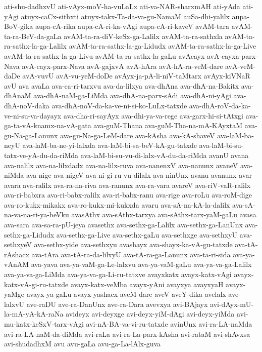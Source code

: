 {ati-shu-dadhxvU
ati-vAyx-moV-ha-vuLaLx
ati-va-NAR-sharxmAH
ati-yAda
ati-yAgi
atuyx-caCx-sithxti
atuyx-takx-Ta-da-va-gu-NamaM
auSa-dhi-yalilx
aupa-BoV-gika
aupa-cA-rika
aupa-cA-ri-ka-vAgi
aupa-cA-ri-kaveV
avAM-tara
avAM-ta-ra-BeV-da-gaLa
avAM-ta-ra-diV-keSx-ga-Lalilx
avAM-ta-ra-sathxla
avAM-ta-ra-sathx-la-ga-Lalilx
avAM-ta-ra-sathx-la-ga-Lidudx
avAM-ta-ra-sathx-la-ga-Live
avAM-ta-ra-sathx-la-ga-Livu
avAM-ta-ra-sathx-la-gaLu
avAcayx
avA-cayxa-parx-Nava
avA-cayx-parx-Nava
avA-gajxvA
avA-hAra
avA-hA-ra-veM-dare
avA-veM-daDe
avA-vuvU
avA-vu-yeM-doDe
avAyx-ja-pA-li-niV-taMtarx
avAyx-kiVNaR
avU
ava
avaLa
ava-ca-ri-tarxvu
ava-da-lilxya
ava-dhAna
ava-dhA-na-Bakitx
ava-dhAnaM
ava-dhA-naM-ga-LiMda
ava-dhA-na-parx-sAdi
ava-dhA-ni-yAgi
ava-dhA-noV-daka
ava-dhA-noV-da-ka-ve-ni-si-ko-LuLx-tatxde
ava-dhA-roV-da-ka-ve-ni-su-va-dayayx
ava-dha-ri-sayAyx
ava-dhi-ya-va-rege
ava-garx-hi-si-tAtxgi
ava-ga-ta-vA-knamx-na-vA-gata
ava-guM-Thana
ava-guM-Tha-na-mA-KAyxtaM
ava-gu-Na-ga-Lanunx
ava-gu-Na-ga-LeM-dare
ava-kAsha
ava-kA-shaveV
ava-laM-ba-neyU
ava-laM-ba-ne-yi-lalxda
ava-laM-bi-sa-beV-kA-gu-tatxde
ava-laM-bi-su-tatx-ve-yA-du-da-riMda
ava-laM-bi-su-vu-di-lalx-vA-du-da-riMda
avanU
avana
ava-nalilx
ava-na-lilxdadx
ava-na-lilx-ruva
ava-nanenxV
ava-nanunx
avaneV
ava-niMda
ava-nige
ava-nigeV
ava-ni-gi-ru-vu-dilalx
ava-ninUnx
avanu
avanunx
avar
avara
ava-ralilx
ava-ra-na-riva
ava-ranunx
ava-ra-vara
avareV
ava-riV-vaR-ralilx
ava-ri-babxra
ava-ri-babx-ralilx
ava-ri-babx-ranu
ava-rige
ava-roLu
ava-roM-dige
ava-ro-kukx-mikakx
ava-ro-kukx-mi-kukxda
avaru
ava-sA-na-kA-la-dalilx
ava-sA-na-va-na-ri-ya-beVku
avasAthx
ava-sAthx-tarxya
ava-sAthx-tarx-yaM-gaLu
avasa
ava-sara
ava-sa-ra-pU-jeya
avasethx
ava-sethx-ga-Lalilx
ava-sethx-ga-LanUnx
ava-sethx-ga-Lidudx
ava-sethx-ga-Live
ava-sethx-gaLu
ava-sethxge
ava-sethxyU
ava-sethxyeV
ava-sethx-yide
ava-sethxyu
avashayx
ava-shayx-ka-vA-gu-tatxde
ava-tA-rAshacx
ava-tAra
ava-tA-ra-da-lilxyU
ava-tA-ra-ga-Lanunx
ava-ta-ri-sida
ava-ya-vAnAM
ava-yava
ava-ya-vaM-ga-Le-lalxvu
ava-ya-vaM-gaLu
ava-ya-va-ga-Lalilx
ava-ya-va-ga-LiMda
ava-ya-va-ga-Li-ru-tatxve
avayxkatx
avayx-katx-vAgi
avayx-katx-vA-gi-ru-tatxde
avayx-katx-veMba
avayx-yAni
avayxya
avayxyaH
avayx-yaMge
avayx-ya-gaLu
avayx-yashacx
aveM-dare
aveV
aveY-dika
avelalx
ave-lalxvU
ave-raDU
ave-ra-DanUnx
ave-ra-Dara
avevxya
avi-BAjayx
avi-dAyx-mU-la-mA-yA-kA-raNa
avideyx
avi-deyxge
avi-deyx-yiM-dAgi
avi-deyx-yiMda
avi-mu-katx-keSxV-tarx-vAgi
avi-nA-BA-va-vi-ru-tatxde
avinUnx
avi-ra-LA-naMda
avi-ra-LA-naM-da-diMda
avi-raLa
avi-ra-La-parx-kAsha
avi-rataM
avi-shAvxsa
avi-shudadhxM
avu
avu-gaLa
avu-ga-La-lAlx-guva
}
